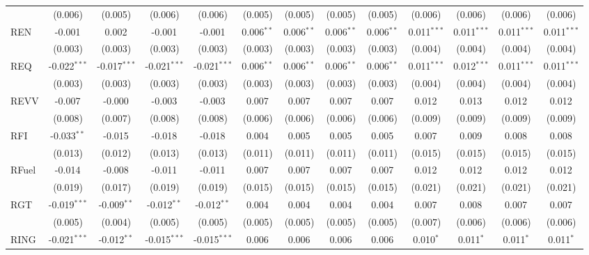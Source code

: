 \begin{table}[!htbp]
\begin{tabular}{@{\extracolsep{5pt}}lcccccccccccc}
  & (0.006) & (0.005) & (0.006) & (0.006) & (0.005) & (0.005) & (0.005) & (0.005) & (0.006) & (0.006) & (0.006) & (0.006) \\
 REN & -0.001$^{}$ & 0.002$^{}$ & -0.001$^{}$ & -0.001$^{}$ & 0.006$^{**}$ & 0.006$^{**}$ & 0.006$^{**}$ & 0.006$^{**}$ & 0.011$^{***}$ & 0.011$^{***}$ & 0.011$^{***}$ & 0.011$^{***}$ \\
  & (0.003) & (0.003) & (0.003) & (0.003) & (0.003) & (0.003) & (0.003) & (0.003) & (0.004) & (0.004) & (0.004) & (0.004) \\
 REQ & -0.022$^{***}$ & -0.017$^{***}$ & -0.021$^{***}$ & -0.021$^{***}$ & 0.006$^{**}$ & 0.006$^{**}$ & 0.006$^{**}$ & 0.006$^{**}$ & 0.011$^{***}$ & 0.012$^{***}$ & 0.011$^{***}$ & 0.011$^{***}$ \\
  & (0.003) & (0.003) & (0.003) & (0.003) & (0.003) & (0.003) & (0.003) & (0.003) & (0.004) & (0.004) & (0.004) & (0.004) \\
 REVV & -0.007$^{}$ & -0.000$^{}$ & -0.003$^{}$ & -0.003$^{}$ & 0.007$^{}$ & 0.007$^{}$ & 0.007$^{}$ & 0.007$^{}$ & 0.012$^{}$ & 0.013$^{}$ & 0.012$^{}$ & 0.012$^{}$ \\
  & (0.008) & (0.007) & (0.008) & (0.008) & (0.006) & (0.006) & (0.006) & (0.006) & (0.009) & (0.009) & (0.009) & (0.009) \\
 RFI & -0.033$^{**}$ & -0.015$^{}$ & -0.018$^{}$ & -0.018$^{}$ & 0.004$^{}$ & 0.005$^{}$ & 0.005$^{}$ & 0.005$^{}$ & 0.007$^{}$ & 0.009$^{}$ & 0.008$^{}$ & 0.008$^{}$ \\
  & (0.013) & (0.012) & (0.013) & (0.013) & (0.011) & (0.011) & (0.011) & (0.011) & (0.015) & (0.015) & (0.015) & (0.015) \\
 RFuel & -0.014$^{}$ & -0.008$^{}$ & -0.011$^{}$ & -0.011$^{}$ & 0.007$^{}$ & 0.007$^{}$ & 0.007$^{}$ & 0.007$^{}$ & 0.012$^{}$ & 0.012$^{}$ & 0.012$^{}$ & 0.012$^{}$ \\
  & (0.019) & (0.017) & (0.019) & (0.019) & (0.015) & (0.015) & (0.015) & (0.015) & (0.021) & (0.021) & (0.021) & (0.021) \\
 RGT & -0.019$^{***}$ & -0.009$^{**}$ & -0.012$^{**}$ & -0.012$^{**}$ & 0.004$^{}$ & 0.004$^{}$ & 0.004$^{}$ & 0.004$^{}$ & 0.007$^{}$ & 0.008$^{}$ & 0.007$^{}$ & 0.007$^{}$ \\
  & (0.005) & (0.004) & (0.005) & (0.005) & (0.005) & (0.005) & (0.005) & (0.005) & (0.007) & (0.006) & (0.006) & (0.006) \\
 RING & -0.021$^{***}$ & -0.012$^{**}$ & -0.015$^{***}$ & -0.015$^{***}$ & 0.006$^{}$ & 0.006$^{}$ & 0.006$^{}$ & 0.006$^{}$ & 0.010$^{*}$ & 0.011$^{*}$ & 0.011$^{*}$ & 0.011$^{*}$ \\

\end{tabular}
\end{table}
